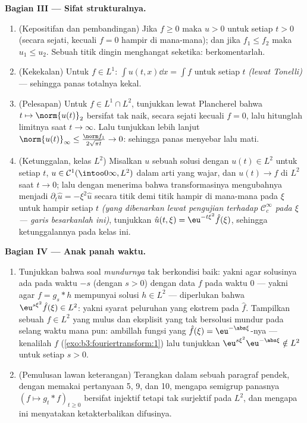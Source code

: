 \begin{problem}[{Soal akhir pekan --- $\partial_tu =
\partial^2_{xx}u$, yang diselesaikan sampai tuntas}]
\medskip
\noindent\textbf{Bagian III --- Sifat strukturalnya.}
\begin{enumerate}[resume]
  \item (Kepositifan dan pembandingan) Jika $f \geq 0$ maka $u > 0$
        untuk setiap $t > 0$ (secara sejati, kecuali $f = 0$ hampir di mana-mana); dan jika
        $f_1 \leq f_2$ maka $u_1 \leq u_2$. Sebuah titik dingin menghangat
        seketika: berkomentarlah.
  \item (Kekekalan) Untuk $f \in L^1$: $\int u(t, x)\dd x =
        \int f$ untuk setiap $t$ \emph{(lewat Tonelli)} --- sehingga panas totalnya
        kekal.
  \item (Pelesapan) Untuk $f \in L^1\cap L^2$, tunjukkan lewat
        Plancherel bahwa $t \mapsto \norm{u(t)}_2$ bersifat
        tak naik, secara sejati kecuali $f = 0$, lalu hitunglah
        limitnya saat $t \to \infty$. Lalu tunjukkan lebih lanjut
        $\norm{u(t)}_\infty \leq \frac{\norm
        f_1}{2\sqrt{\pi t}} \to 0$: sehingga panas menyebar lalu mati.
  \item (Ketunggalan, kelas $L^2$) Misalkan $u$ sebuah solusi dengan
        $u(t) \in L^2$ untuk setiap $t$, $u \in \mathcal
        C^1(\intoo0\infty, L^2)$ dalam arti yang wajar, dan
        $u(t) \to f$ di $L^2$ saat $t\to0$; lalu dengan menerima bahwa
        transformasinya mengubahnya menjadi $\partial_t\hat u =
        -\xi^2\hat u$ secara titik demi titik hampir di mana-mana pada $\xi$ untuk hampir setiap $t$
        \emph{(yang dibenarkan lewat pengujian terhadap $\mathcal
        C_c^\infty$ pada $\xi$ --- garis besarkanlah ini)}, tunjukkan
        $\hat u(t,\xi) = \eu^{-t\xi^2}\hat f(\xi)$, sehingga
        ketunggalannya pada kelas ini.
\end{enumerate}

\medskip
\noindent\textbf{Bagian IV --- Anak panah waktu.}
\begin{enumerate}[resume]
  \item Tunjukkan bahwa soal \emph{mundurnya} tak berkondisi baik:
        yakni agar solusinya ada pada waktu $-s$ (dengan $s > 0$) dengan
        data $f$ pada waktu $0$ --- yakni agar $f = g_s * h$
        mempunyai solusi $h \in L^2$ --- diperlukan bahwa
        $\eu^{s\xi^2}\hat f(\xi) \in L^2$: yakni syarat peluruhan yang
        ekstrem pada $\hat f$. Tampilkan sebuah $f \in L^2$ yang mulus dan
        eksplisit yang tak bersolusi mundur pada selang
        waktu mana pun: ambillah fungsi yang $\hat f(\xi) =
        \eu^{-\abs\xi}$-nya --- kenalilah $f$
        (\cref{exo:b3:fouriertransform:1}) lalu tunjukkan
        $\eu^{s\xi^2}\eu^{-\abs\xi} \notin L^2$ untuk setiap $s >
        0$.
  \item (Pemulusan lawan keterangan) Terangkan dalam sebuah paragraf
        pendek, dengan memakai pertanyaan 5, 9, dan 10, mengapa semigrup
        panasnya $(f \mapsto g_t * f)_{t\geq0}$ bersifat injektif
        tetapi tak surjektif pada $L^2$, dan mengapa ini menyatakan
        ketakterbalikan difusinya.
\end{enumerate}


\end{problem}
